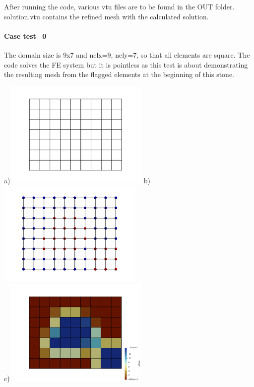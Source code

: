After running the code, various vtu files are to be found in the OUT folder.
{\filenamefont solution.vtu} contains the refined mesh with the calculated 
solution. 

\newpage
\paragraph{Case test=0}

The domain size is 9x7 and nelx=9, nely=7, so that all elements are square. 
The code solves the FE system but it is pointless as this test is about demonstrating 
the resulting mesh from the flagged elements at the beginning of this stone. 

\begin{center}
a)\includegraphics[width=7cm]{python_codes/fieldstone_102/results/test0/mesh1}
b)\includegraphics[width=7cm]{python_codes/fieldstone_102/results/test0/mesh2}\\
c)\includegraphics[width=7cm]{python_codes/fieldstone_102/results/test0/mesh3}

\end{center}
